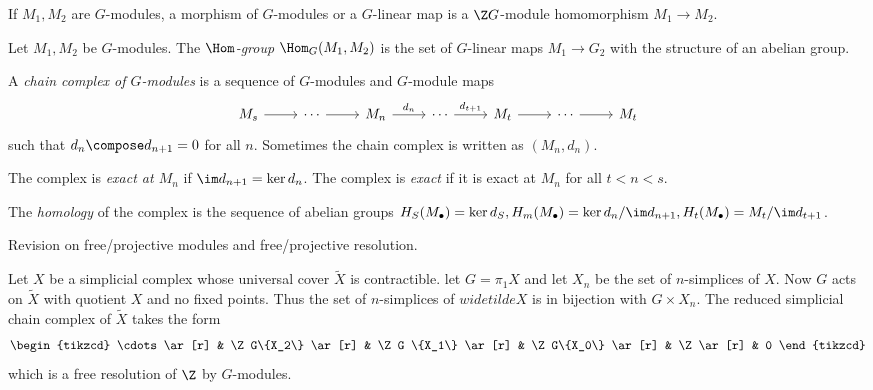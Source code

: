 \documentclass[a4paper]{article}
\begin{document}
\begin{definition}
  If \(M_1, M_2\) are \(G\)-modules, a morphism of \(G\)-modules or a \(G\)-linear map is a \(\Z G\)-module homomorphism \(M_1 \to M_2\).
\end{definition}

\begin{definition}
  Let \(M_1, M_2\) be \(G\)-modules. The \emph{\(\Hom\)-group} \(\Hom_G(M_1, M_2)\) is the set of \(G\)-linear maps \(M_1 \to G_2\) with the structure of an abelian group.
\end{definition}

\begin{definition}
  A \emph{chain complex of \(G\)-modules} is a sequence of \(G\)-modules and \(G\)-module maps
  \[
    \begin{tikzcd}
      M_s \ar[r] & \cdots \ar[r] & M_n \ar[r, "d_n"] & \cdots \ar[r, "d_{t + 1}"] & M_t \ar[r] & \cdots \ar[r] & M_t
    \end{tikzcd}
  \]
  such that \(d_n \compose d_{n + 1} = 0\) for all \(n\). Sometimes the chain complex is written as \((M_n, d_n)\).

  The complex is \emph{exact at \(M_n\)} if \(\im d_{n + 1} = \ker d_n\). The complex is \emph{exact} if it is exact at \(M_n\) for all \(t < n < s\).

  The \emph{homology} of the complex is the sequence of abelian groups \(H_S(M_\bullet) = \ker d_S, H_m(M_\bullet) = \ker d_n/\im d_{n + 1}, H_t(M_\bullet) = M_t/\im d_{t + 1}\).
\end{definition}

Revision on free/projective modules and free/projective resolution.

\begin{eg}
  Let \(X\) be a simplicial complex whose universal cover \(\widetilde X\) is contractible. let \(G = \pi_1X\) and let \(X_n\) be the set of \(n\)-simplices of \(X\). Now \(G\) acts on \(\widetilde X\) with quotient \(X\) and no fixed points. Thus the set of \(n\)-simplices of \(widetilde X\) is in bijection with \(G \times X_n\). The reduced simplicial chain complex of \(\widetilde X\) takes the form
  \[
    \begin{tikzcd}
      \cdots \ar[r] & \Z G\{X_2\} \ar[r] & \Z G \{X_1\} \ar[r] & \Z G\{X_0\} \ar[r] & \Z \ar[r] & 0
    \end{tikzcd}
  \]
  which is a free resolution of \(\Z\) by \(G\)-modules.
\end{eg}
\end{document}
